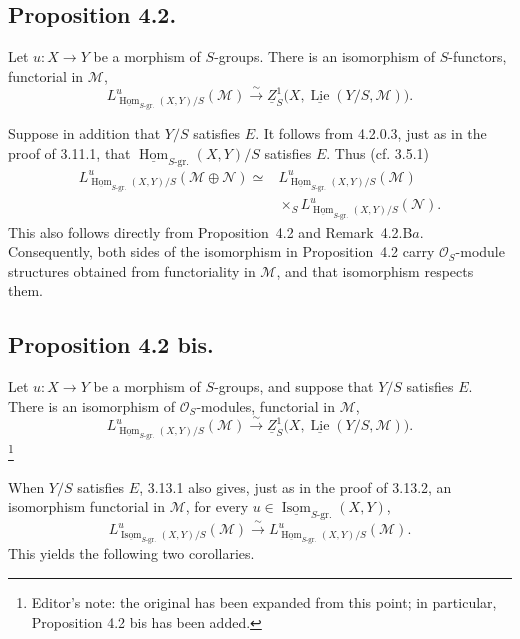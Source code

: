 \subsection*{Proposition 4.2.}
Let \(u:X\to Y\) be a morphism of \(S\)-groups. There is an isomorphism
of \(S\)-functors, functorial in \(\mathcal M\),
\[
 L^u_{\underline{\operatorname{Hom}}_{S\text{-gr.}}(X,Y)/S}
   (\mathcal M)
 \xrightarrow{\sim}
 \underline Z^1_S
   \bigl(X,\underline{\operatorname{Lie}}(Y/S,\mathcal M)\bigr).
\]

Suppose in addition that \(Y/S\) satisfies \(E\). It follows from
4.2.0.3, just as in the proof of 3.11.1, that
\(\underline{\operatorname{Hom}}_{S\text{-gr.}}(X,Y)/S\) satisfies
\(E\). Thus (cf. 3.5.1)
\[
\begin{aligned}
 L^u_{\underline{\operatorname{Hom}}_{S\text{-gr.}}(X,Y)/S}
 (\mathcal M\oplus\mathcal N)
 \simeq{}&
 L^u_{\underline{\operatorname{Hom}}_{S\text{-gr.}}(X,Y)/S}
 (\mathcal M)\\
 &\times_S
 L^u_{\underline{\operatorname{Hom}}_{S\text{-gr.}}(X,Y)/S}
 (\mathcal N).
\end{aligned}
\]
This also follows directly from Proposition~4.2 and Remark~4.2.B\(a\).
Consequently, both sides of the isomorphism in Proposition~4.2 carry
\(\mathcal O_S\)-module structures obtained from functoriality in
\(\mathcal M\), and that isomorphism respects them.

\subsection*{Proposition 4.2 bis.}
Let \(u:X\to Y\) be a morphism of \(S\)-groups, and suppose that \(Y/S\)
satisfies \(E\). There is an isomorphism of \(\mathcal O_S\)-modules,
functorial in \(\mathcal M\),
\[
 L^u_{\underline{\operatorname{Hom}}_{S\text{-gr.}}(X,Y)/S}
   (\mathcal M)
 \xrightarrow{\sim}
 \underline Z^1_S
   \bigl(X,\underline{\operatorname{Lie}}(Y/S,\mathcal M)\bigr).
\]
\footnote{Editor's note: the original has been expanded from this point;
in particular, Proposition 4.2 bis has been added.}

When \(Y/S\) satisfies \(E\), 3.13.1 also gives, just as in the proof of
3.13.2, an isomorphism functorial in \(\mathcal M\), for every
\(u\in\underline{\operatorname{Isom}}_{S\text{-gr.}}(X,Y)\),
\begin{equation}
 L^u_{\underline{\operatorname{Isom}}_{S\text{-gr.}}(X,Y)/S}
   (\mathcal M)
 \xrightarrow{\sim}
 L^u_{\underline{\operatorname{Hom}}_{S\text{-gr.}}(X,Y)/S}
   (\mathcal M).
 \tag{*}
\end{equation}
This yields the following two corollaries.

